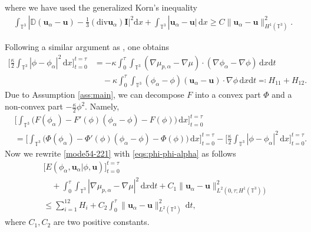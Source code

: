 \documentclass[reqno,a4paper,11pt]{amsart}
\theoremstyle{plain}
\numberwithin{equation}{section}
\newcommand{\bb}[1]{\mathbb{#1}}
\newcommand{\bbt}{\bb{T}}
\newcommand{\bu}{\mathbf{u}}
\renewcommand{\d}{\mathrm{d}}
\newcommand{\dx}{\d x}
\newcommand{\dxdt}{\,\d x \d t}
\newcommand{\dt}{\d t}
\newcommand{\abs}[1]{\left\vert #1 \right \vert}
\begin{document}
				where we have used the generalized Korn's inequality \cite[Theorem 10.16]{FN}
				\begin{align*}
					\int_{\mathbb{T}^{3}}|
					\mathbb{ D}( \mathbf{u}_{\alpha}-\mathbf{u})-\frac{1}{3} (\mathrm{div}  \mathbf{u}_{\alpha}) \mathbf{I}\big|^{2}\dx+ \int_{\mathbb{T}^{3}} |\mathbf{u}_{\alpha}-\mathbf{u}|\,\dx
					\geq C\| \mathbf{u}_{\alpha}-\mathbf{u}\|_{H^{1}(\mathbb{T}^{3})}^{2}.
				\end{align*}
				
				
				Following a similar argument as \cite[(3.11)]{ALN2024}, one obtains
				\begin{align}
					\nonumber
					\bigg[\frac{\kappa}{2}\int_{\bbt^3} \abs{\phi - \phi_\alpha}^2 \,\dx\bigg]_{t=0}^{t=\tau} 
					& = - \kappa \int_0^\tau \int_{\bbt^3} (\nabla \mu_{p,\alpha} - \nabla \mu) \cdot (\nabla \phi_\alpha - \nabla \phi) \dxdt \\
					\label{eqs:phi-phi-alpha}
					& \quad - \kappa \int_0^\tau \int_{\bbt^3} ( \phi_\alpha - \phi) (\bu_\alpha - \bu) \cdot \nabla \phi \dxdt
					\eqqcolon H_{11} + H_{12}.
				\end{align}
				Due to Assumption \ref{ass:main}, we can decompose $F$ into a convex part $\Phi$ and a non-convex part $- \frac{\kappa}{2} \phi^2$. Namely, 
				\begin{align*}
					& \bigg[\int_{\mathbb{T}^{3}}\big(F(\phi_{\alpha})- F'(\phi)(\phi_{\alpha}-\phi)-F(\phi)\big)\,\dx\bigg]_{t=0}^{t=\tau} \\
					& = \bigg[\int_{\mathbb{T}^{3}}\big(\Phi(\phi_{\alpha})- \Phi'(\phi)(\phi_{\alpha}-\phi)-\Phi(\phi)\big)\,\dx\bigg]_{t=0}^{t=\tau}
					- \bigg[\frac{\kappa}{2}\int_{\bbt^3} \abs{\phi - \phi_\alpha}^2 \,\dx\bigg]_{t=0}^{t=\tau}.
				\end{align*}
				Now we rewrite \eqref{mode54-221} with \eqref{eqs:phi-phi-alpha} as follows
				\begin{align}
					\label{mode54-223}
					&\nonumber \bigg[ E(\phi_{\alpha},\mathbf{u}_{\alpha}|\phi,\mathbf{u})\bigg]_{t=0}^{t=\tau}
					\\&\quad\nonumber+\int_0^{\tau}\int_{\mathbb{T}^{3}}|\nabla \mu_{p,\alpha}-\nabla \mu|^{2}\dxdt
					+  C_1 \| \mathbf{u}_{\alpha}-\mathbf{u}\|_{L^2(0,\tau;H^{1}(\mathbb{T}^{3}))}^{2}
					\\&\leq\sum_{i=1}^{12}H_{i}+ C_2 \int_0^\tau \| \mathbf{u}_{\alpha}-\mathbf{u}\|_{L^{2}(\mathbb{T}^{3})}^{2} \,\dt,
				\end{align}
				where $C_1, C_2$ are two positive constants.
				
\end{document}
